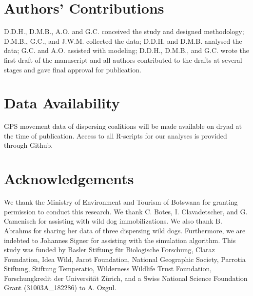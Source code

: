 \documentclass[abstract=on,10pt,a4paper,bibliography=totocnumbered]{article}
\begin{document}
\section{Authors' Contributions}
D.D.H., D.M.B., A.O. and G.C. conceived the study and designed methodology;
D.M.B., G.C., and J.W.M. collected the data; D.D.H. and D.M.B. analysed the
data; G.C. and A.O. assisted with modeling; D.D.H., D.M.B., and G.C. wrote the
first draft of the manuscript and all authors contributed to the drafts at
several stages and gave final approval for publication.

\section{Data Availability}
GPS movement data of dispersing coalitions will be made available on dryad at
the time of publication. Access to all R-scripts for our analyses is provided
through Github.

\section{Acknowledgements}
We thank the Ministry of Environment and Tourism of Botswana for granting
permission to conduct this research. We thank C. Botes, I. Clavadetscher, and G.
Camenisch for assisting with wild dog immobilizations. We also thank B. Abrahms
for sharing her data of three dispersing wild dogs. Furthermore, we are indebted
to Johannes Signer for assisting with the simulation algorithm. This study was
funded by Basler Stiftung für Biologische Forschung, Claraz Foundation, Idea
Wild, Jacot Foundation, National Geographic Society, Parrotia Stiftung, Stiftung
Temperatio, Wilderness Wildlife Trust Foundation, Forschungkredit der
Universität Zürich, and a Swiss National Science Foundation Grant
(31003A\_182286) to A. Ozgul.

\newpage
\begingroup
\singlespacing

\endgroup
\end{document}
